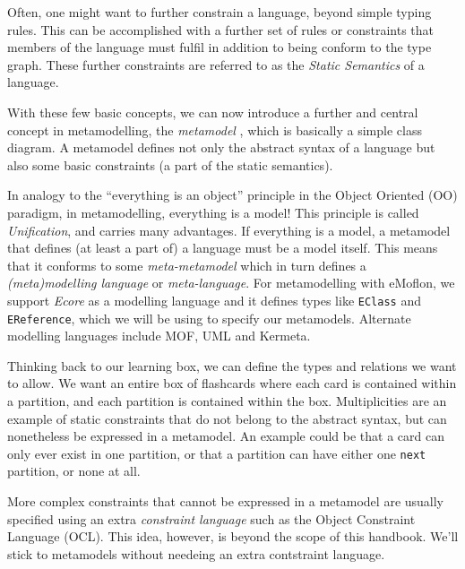 Often, one might want to further constrain a language, beyond simple typing rules.
This can be accomplished with a further set of rules or constraints that members of the language must fulfil in addition to being conform to the type graph.
These further constraints are referred to as the \emph{Static Semantics} of a language.

With these few basic concepts, we can now introduce a further and central concept in metamodelling, the \emph{metamodel} , which is basically a simple class diagram.
A metamodel defines not only the abstract syntax of a language but also some basic constraints (a part of the static semantics).

In analogy to the ``everything is an object'' principle in the Object Oriented (OO) paradigm, in metamodelling, everything is a model! This principle is called \emph{Unification},  and carries many advantages. If everything is a model, a metamodel that defines (at least a part of) a language must be a model itself. This means that it conforms to some \emph{meta-metamodel} which in turn defines a \emph{(meta)modelling language} or \emph{meta-language}.
For metamodelling with eMoflon, we support \emph{Ecore} as a modelling language and it defines types like \texttt{EClass} and \texttt{EReference}, which we will be using to specify  our metamodels.
Alternate modelling languages include MOF, UML and Kermeta.

Thinking back to our learning box, we can define the types and relations we want to allow. We want an entire box of flashcards where each card is contained within a partition, and each partition is contained within the box. Multiplicities are an example of static constraints that do not belong to the abstract syntax, but can nonetheless be expressed in a metamodel.
An example could be that a card can only ever exist in one partition, or that a partition can have either one \texttt{next} partition, or none at all.

More complex constraints that cannot be expressed in a metamodel are usually specified using an extra \emph{constraint language} such as the Object Constraint Language (OCL). This idea, however,  is beyond the scope of this handbook. We'll stick to metamodels without needeing an extra contstraint language. 

